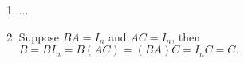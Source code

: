 {\color{solution}
\begin{enumerate}
	\item ...
	\item Suppose $BA = I_n$ and $AC = I_n$, then $B = BI_n =B(AC) = (BA)C=I_nC = C. $

\end{enumerate}
}
